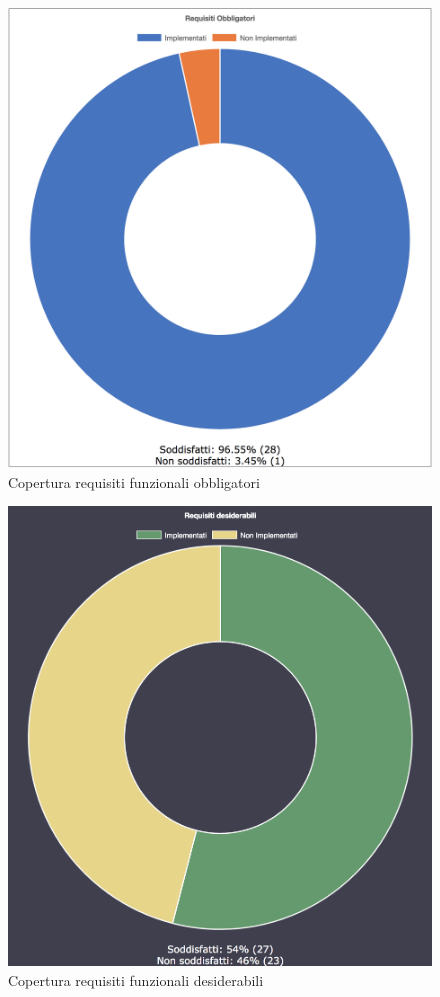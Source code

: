 \begin{figure}[H]
	\centering
	\includegraphics[scale = 0.6]{Images/obbligatori.png}
	\caption{Copertura requisiti funzionali obbligatori}
	\label{img:seqGraph}
\end{figure}
\begin{figure}[H]
	\centering
	\includegraphics[scale = 0.6]{Images/desiderabili.png}
	\caption{Copertura requisiti funzionali desiderabili}
	\label{img:seqGraph}
\end{figure}
